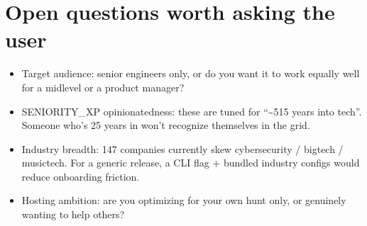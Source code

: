 \documentclass[a4paper,11pt,english]{sphinxmanual}
\begin{document}
\section{Open questions worth asking the user}
\label{\detokenize{analysis:open-questions-worth-asking-the-user}}\begin{itemize}
\item {} 
\sphinxAtStartPar
Target audience: senior engineers only, or do you want it to work
equally well for a mid\sphinxhyphen{}level or a product manager?

\item {} 
\sphinxAtStartPar
SENIORITY\_XP opinionatedness: these are tuned for “\textasciitilde{}5\sphinxhyphen{}15 years into
tech”. Someone who’s 25 years in won’t recognize themselves in the
grid.

\item {} 
\sphinxAtStartPar
Industry breadth: 147 companies currently skew cybersecurity /
big\sphinxhyphen{}tech / music\sphinxhyphen{}tech. For a generic release, a  CLI flag + bundled industry configs would reduce
onboarding friction.

\item {} 
\sphinxAtStartPar
Hosting ambition: are you optimizing for your own hunt only, or
genuinely wanting to help others?

\end{itemize}



\renewcommand{\indexname}{Index}
\printindex
\end{document}
